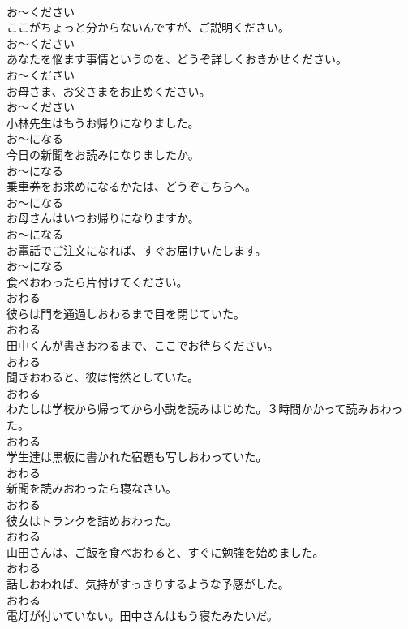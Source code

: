 \documentclass[8pt]{extreport}
\begin{document}
\begin{CJK}{UTF8}{min}
\\	お～ください
\\	ここがちょっと分からないんですが、ご説明ください。	
\\	お～ください
\\	あなたを悩ます事情というのを、どうぞ詳しくおきかせください。	
\\	お～ください
\\	お母さま、お父さまをお止めください。	
\\	お～ください
\\	小林先生はもうお帰りになりました。	
\\	お～になる
\\	今日の新聞をお読みになりましたか。	
\\	お～になる
\\	乗車券をお求めになるかたは、どうぞこちらへ。	
\\	お～になる
\\	お母さんはいつお帰りになりますか。	
\\	お～になる
\\	お電話でご注文になれば、すぐお届けいたします。	
\\	お～になる
\\	食べおわったら片付けてください。	
\\	おわる
\\	彼らは門を通過しおわるまで目を閉じていた。	
\\	おわる
\\	田中くんが書きおわるまで、ここでお待ちください。	
\\	おわる
\\	聞きおわると、彼は愕然としていた。	
\\	おわる
\\	わたしは学校から帰ってから小説を読みはじめた。３時間かかって読みおわった。	
\\	おわる
\\	学生達は黒板に書かれた宿題も写しおわっていた。	
\\	おわる
\\	新聞を読みおわったら寝なさい。	
\\	おわる
\\	彼女はトランクを詰めおわった。	
\\	おわる
\\	山田さんは、ご飯を食べおわると、すぐに勉強を始めました。	
\\	おわる
\\	話しおわれば、気持がすっきりするような予感がした。	
\\	おわる
\\	電灯が付いていない。田中さんはもう寝たみたいだ。	

\end{CJK}
\end{document}
